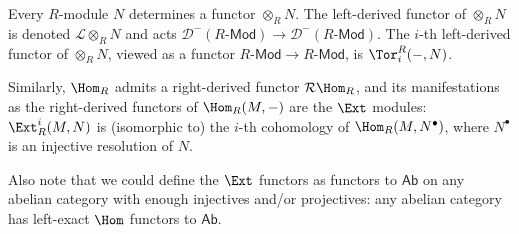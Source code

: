 \begin{example}
Every $R$-module $N$ determines a functor $\otimes_{R}N$. The left-derived functor of $\otimes_{R}N$ is denoted $\mathcal{L}\otimes_{R}N$ and acts $\mathcal{D}^-(R\text{-}\mathsf{Mod})\to\mathcal{D}^-(R\text{-}\mathsf{Mod})$. The $i$-th left-derived functor of $\otimes_{R}N$, viewed as a functor $R$-$\mathsf{Mod}\to R$-$\mathsf{Mod}$, is $\Tor^R_i(-,N)$.
\end{example}
\begin{example}
Similarly, $\Hom_R$ admits a right-derived functor $\mathcal{R}\Hom_R$, and its manifestations as the right-derived functors of $\Hom_R(M,-)$ are the $\Ext$ modules: $\Ext^i_R(M,N)$ is (isomorphic to) the $i$-th cohomology of $\Hom_R(M,N^\bullet)$, where $N^\bullet$ is an injective resolution of $N$.
\end{example}
Also note that we could define the $\Ext$ functors as functors to $\mathsf{Ab}$ on any abelian category with enough injectives and/or projectives: any abelian category has left-exact $\Hom$ functors to $\mathsf{Ab}$.
